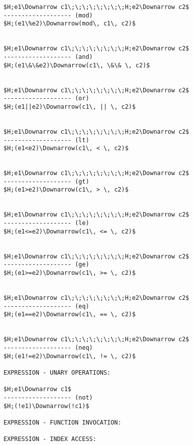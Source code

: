 \documentclass[11pt, a4paper]{article}
\begin{document}
\begin{lstlisting}
$H;e1\Downarrow c1\;\;\;\;\;\;\;\;H;e2\Downarrow c2$
------------------- (mod)
$H;(e1\%e2)\Downarrow(mod\, c1\, c2)$


$H;e1\Downarrow c1\;\;\;\;\;\;\;\;H;e2\Downarrow c2$
------------------- (and)
$H;(e1\&\&e2)\Downarrow(c1\, \&\& \, c2)$


$H;e1\Downarrow c1\;\;\;\;\;\;\;\;H;e2\Downarrow c2$
------------------- (or)
$H;(e1||e2)\Downarrow(c1\, || \, c2)$


$H;e1\Downarrow c1\;\;\;\;\;\;\;\;H;e2\Downarrow c2$
------------------- (lt)
$H;(e1<e2)\Downarrow(c1\, < \, c2)$


$H;e1\Downarrow c1\;\;\;\;\;\;\;\;H;e2\Downarrow c2$
------------------- (gt)
$H;(e1>e2)\Downarrow(c1\, > \, c2)$


$H;e1\Downarrow c1\;\;\;\;\;\;\;\;H;e2\Downarrow c2$
------------------- (le)
$H;(e1<=e2)\Downarrow(c1\, <= \, c2)$


$H;e1\Downarrow c1\;\;\;\;\;\;\;\;H;e2\Downarrow c2$
------------------- (ge)
$H;(e1>=e2)\Downarrow(c1\, >= \, c2)$


$H;e1\Downarrow c1\;\;\;\;\;\;\;\;H;e2\Downarrow c2$
------------------- (eq)
$H;(e1==e2)\Downarrow(c1\, == \, c2)$


$H;e1\Downarrow c1\;\;\;\;\;\;\;\;H;e2\Downarrow c2$
------------------- (neq)
$H;(e1!=e2)\Downarrow(c1\, != \, c2)$

EXPRESSION - UNARY OPERATIONS:

$H;e1\Downarrow c1$
------------------- (not)
$H;(!e1)\Downarrow(!c1)$

EXPRESSION - FUNCTION INVOCATION:

EXPRESSION - INDEX ACCESS:
\end{lstlisting}
\end{document}
